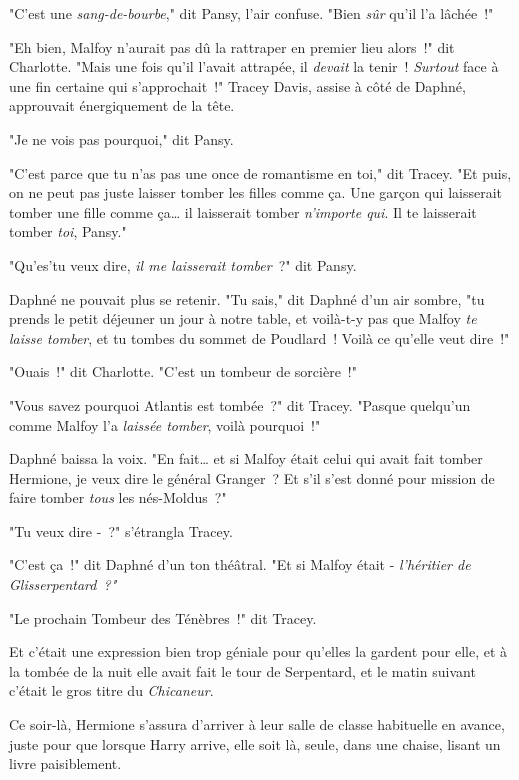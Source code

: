 "C'est une \emph{sang-de-bourbe}," dit Pansy, l'air confuse. "Bien \emph{sûr} qu'il l'a lâchée~!"

"Eh bien, Malfoy n'aurait pas dû la rattraper en premier lieu alors~!" dit Charlotte. "Mais une fois qu'il l'avait attrapée, il \emph{devait} la tenir~! \emph{Surtout} face à une fin certaine qui s'approchait~!" Tracey Davis, assise à côté de Daphné, approuvait énergiquement de la tête.

"Je ne vois pas pourquoi," dit Pansy.

"C'est parce que tu n'as pas une once de romantisme en toi," dit Tracey. "Et puis, on ne peut pas juste laisser tomber les filles comme ça. Une garçon qui laisserait tomber une fille comme ça… il laisserait tomber \emph{n'importe qui}. Il te laisserait tomber \emph{toi}, Pansy."

"Qu'es'tu veux dire, \emph{il me laisserait tomber}~?" dit Pansy.

Daphné ne pouvait plus se retenir. "Tu sais," dit Daphné d'un air sombre, "tu prends le petit déjeuner un jour à notre table, et voilà-t-y pas que Malfoy \emph{te laisse tomber}, et tu tombes du sommet de Poudlard~! Voilà ce qu'elle veut dire~!"

"Ouais~!" dit Charlotte. "C'est un tombeur de sorcière~!"

"Vous savez pourquoi Atlantis est tombée~?" dit Tracey. "Pasque quelqu'un comme Malfoy l'a \emph{laissée tomber}, voilà pourquoi~!"

Daphné baissa la voix. "En fait… et si Malfoy était celui qui avait fait tomber Hermione, je veux dire le général Granger~? Et s'il s'est donné pour mission de faire tomber \emph{tous} les nés-Moldus~?"

"Tu veux dire -~?" s'étrangla Tracey.

"C'est ça~!" dit Daphné d'un ton théâtral. "Et si Malfoy était - \emph{l'héritier de Glisserpentard~?"}

"Le prochain Tombeur des Ténèbres~!" dit Tracey.

Et c'était une expression bien trop géniale pour qu'elles la gardent pour elle, et à la tombée de la nuit elle avait fait le tour de Serpentard, et le matin suivant c'était le gros titre du \emph{Chicaneur}.


Ce soir-là, Hermione s'assura d'arriver à leur salle de classe habituelle en avance, juste pour que lorsque Harry arrive, elle soit là, seule, dans une chaise, lisant un livre paisiblement.

